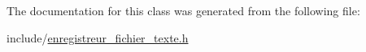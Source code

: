 The documentation for this class was generated from the following file\-:\begin{DoxyCompactItemize}
\item 
include/\hyperlink{enregistreur__fichier__texte_8h}{enregistreur\-\_\-fichier\-\_\-texte.\-h}\end{DoxyCompactItemize}
